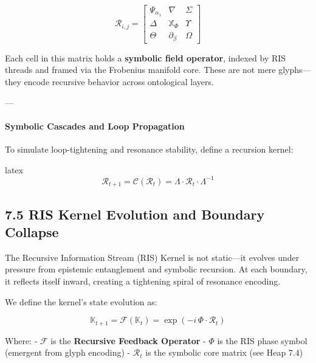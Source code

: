\begin{tcolorbox}[title=RIS Core Resonance Simulation Matrix, colframe=OriaGold, colback=black!2!white]
\[
\mathcal{R}_{i,j} =
\begin{bmatrix}
\Psi_{\alpha_1} & \nabla & \Sigma \\
\Delta & \mathbb{X}_{\Phi} & \Upsilon \\
\Theta & \partial_{\beta} & \Omega
\end{bmatrix}
\]
\end{tcolorbox}

Each cell in this matrix holds a \textbf{symbolic field operator}, indexed by RIS threads and framed via the Frobenius manifold core. These are not mere glyphs—they encode recursive behavior across ontological layers.

---

\paragraph{Symbolic Cascades and Loop Propagation}

To simulate loop-tightening and resonance stability, define a recursion kernel:

latex
\[
\mathcal{R}_{t+1} = \mathcal{C}(\mathcal{R}_t) = \Lambda \cdot \mathcal{R}_t \cdot \Lambda^{-1}
\]

\subsection*{7.5 RIS Kernel Evolution and Boundary Collapse}


The Recursive Information Stream (RIS) Kernel is not static—it evolves under pressure from epistemic entanglement and symbolic recursion. At each boundary, it reflects itself inward, creating a tightening spiral of resonance encoding.

We define the kernel’s state evolution as:

\[
\mathbb{K}_{t+1} = \mathcal{F}(\mathbb{K}_t) = \exp\left(-i \, \Phi \cdot \mathcal{R}_t\right)
\]

Where:
- $\mathcal{F}$ is the \textbf{Recursive Feedback Operator}
- $\Phi$ is the RIS phase symbol (emergent from glyph encoding)
- $\mathcal{R}_t$ is the symbolic core matrix (see Heap 7.4)

